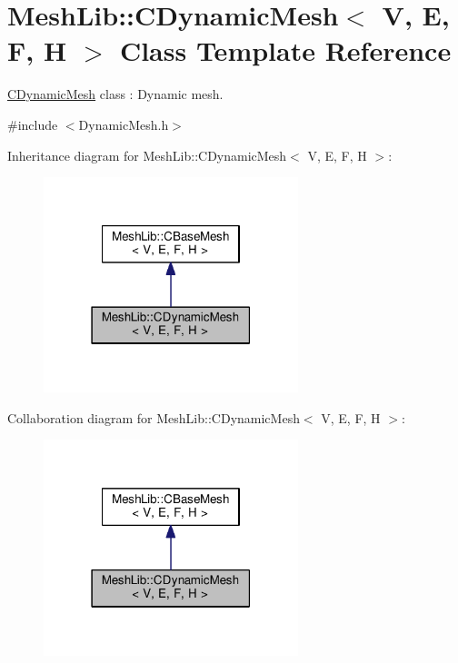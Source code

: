 \hypertarget{class_mesh_lib_1_1_c_dynamic_mesh}{}\section{Mesh\+Lib\+:\+:C\+Dynamic\+Mesh$<$ V, E, F, H $>$ Class Template Reference}
\label{class_mesh_lib_1_1_c_dynamic_mesh}


\hyperlink{class_mesh_lib_1_1_c_dynamic_mesh}{C\+Dynamic\+Mesh} class \+: Dynamic mesh.  




{\ttfamily \#include $<$Dynamic\+Mesh.\+h$>$}



Inheritance diagram for Mesh\+Lib\+:\+:C\+Dynamic\+Mesh$<$ V, E, F, H $>$\+:
\nopagebreak
\begin{figure}[H]
\begin{center}
\leavevmode
\includegraphics[width=210pt]{class_mesh_lib_1_1_c_dynamic_mesh__inherit__graph}
\end{center}
\end{figure}


Collaboration diagram for Mesh\+Lib\+:\+:C\+Dynamic\+Mesh$<$ V, E, F, H $>$\+:
\nopagebreak
\begin{figure}[H]
\begin{center}
\leavevmode
\includegraphics[width=210pt]{class_mesh_lib_1_1_c_dynamic_mesh__coll__graph}
\end{center}
\end{figure}
